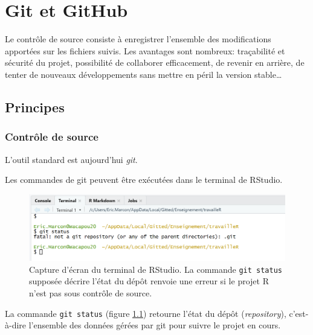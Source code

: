 \documentclass[
  12pt,
  french,
  a4paper,
  extrafontsizes,onecolumn,openright
  ]{memoir}
\begin{document}
\hypertarget{chap:git}{%
\chapter{Git et GitHub}\label{chap:git}}

Le contrôle de source consiste à enregistrer l'ensemble des modifications apportées sur les fichiers suivis.
Les avantages sont nombreux: traçabilité et sécurité du projet, possibilité de collaborer efficacement, de revenir en arrière, de tenter de nouveaux développements sans mettre en péril la version stable\ldots{}

\hypertarget{sec:principes-git}{%
\section{Principes}\label{sec:principes-git}}

\hypertarget{sec:git-cds}{%
\subsection{Contrôle de source}\label{sec:git-cds}}

L'outil standard est aujourd'hui \emph{git}.

Les commandes de git peuvent être exécutées dans le terminal de RStudio.



\scriptsize

\begin{figure}

{\centering \includegraphics[width=0.8\linewidth]{images/git-Status} 

}

\caption{Capture d'écran du terminal de RStudio. La commande \texttt{git\ status} supposée décrire l'état du dépôt renvoie une erreur si le projet R n'est pas sous contrôle de source.}\label{fig:git-Status}
\end{figure}

\normalsize

La commande \texttt{git\ status} (figure \ref{fig:git-Status}) retourne l'état du dépôt (\emph{repository}), c'est-à-dire l'ensemble des données gérées par git pour suivre le projet en cours.
\end{document}
